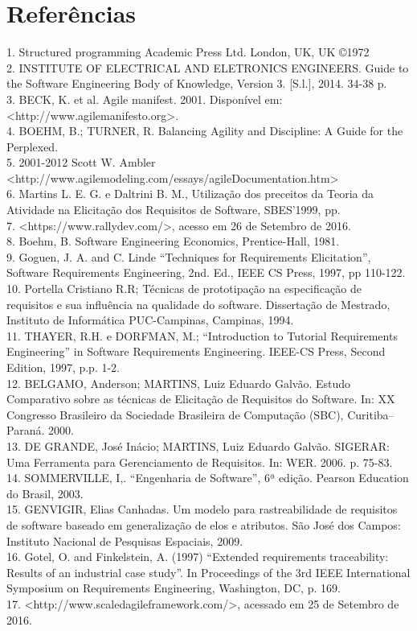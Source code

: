 
\chapter[Referências]{Referências}
1. Structured programming  Academic Press Ltd. London, UK, UK ©1972\\
2. INSTITUTE OF ELECTRICAL AND ELETRONICS ENGINEERS. Guide to the Software Engineering Body of Knowledge, Version 3. [S.l.], 2014. 34-38 p.\\
3. BECK, K. et al. Agile manifest. 2001. Disponível em: \\<http://www.agilemanifesto.org>.\\
4. BOEHM, B.; TURNER, R. Balancing Agility and Discipline: A Guide for the Perplexed.\\
5. 2001-2012 Scott W. Ambler \\<http://www.agilemodeling.com/essays/agileDocumentation.htm>\\
6. Martins L. E. G. e Daltrini B. M., Utilização dos preceitos da Teoria da Atividade na Elicitação dos Requisitos de Software, SBES’1999, pp.\\
7. <https://www.rallydev.com/>, acesso em 26 de Setembro de 2016.\\
8. Boehm, B. Software Engineering Economics, Prentice-Hall, 1981.\\
9. Goguen, J. A. and C. Linde “Techniques for Requirements Elicitation”, Software Requirements Engineering, 2nd. Ed., IEEE CS Press, 1997, pp 110-122.\\
10. Portella Cristiano R.R; Técnicas de prototipação na especificação de requisitos e sua influência na qualidade do software. Dissertação de Mestrado, Instituto de Informática PUC-Campinas, Campinas, 1994.\\
11. THAYER, R.H. e DORFMAN, M.; “Introduction to Tutorial Requirements Engineering” in Software Requirements Engineering. IEEE-CS Press, Second Edition, 1997, p.p. 1-2.\\
12. BELGAMO, Anderson; MARTINS, Luiz Eduardo Galvão. Estudo Comparativo sobre as técnicas de Elicitação de Requisitos do Software. In: XX Congresso Brasileiro da Sociedade Brasileira de Computação (SBC), Curitiba–Paraná. 2000.\\
13. DE GRANDE, José Inácio; MARTINS, Luiz Eduardo Galvão. SIGERAR: Uma Ferramenta para Gerenciamento de Requisitos. In: WER. 2006. p. 75-83.\\
14. SOMMERVILLE, I,. “Engenharia de Software”, 6ª edição. Pearson Education do Brasil, 2003.\\
15. GENVIGIR, Elias Canhadas. Um modelo para rastreabilidade de requisitos de software baseado em generalização de elos e atributos. São José dos Campos: Instituto Nacional de Pesquisas Espaciais, 2009.\\
16. Gotel, O. and Finkelstein, A. (1997) “Extended requirements traceability: Results of an industrial case study”. In Proceedings of the 3rd IEEE International Symposium on Requirements Engineering, Washington, DC, p. 169.\\
17. <http://www.scaledagileframework.com/>, acessado em 25 de Setembro de 2016.
